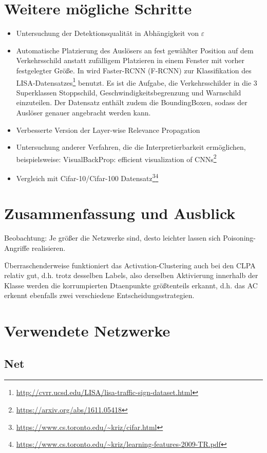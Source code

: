 \documentclass[11pt,a4paper]{article}
\numberwithin{equation}{section}
\begin{document}
	\section{Weitere mögliche Schritte} \label{chapter_weitereSchritte}
	\begin{itemize}
		\item Untersuchung der Detektionsqualität in Abhängigkeit von $\varepsilon$
		\item Automatische Platzierung des Auslösers an fest gewählter Position auf dem Verkehrsschild anstatt zufälligem Platzieren in einem Fenster mit vorher festgelegter Größe. In \cite{badnets} wird  Faster-RCNN (F-RCNN) zur Klassifikation des LISA-Datensatzes\footnote{\url{http://cvrr.ucsd.edu/LISA/lisa-traffic-sign-dataset.html}} benutzt. Es ist die Aufgabe, die Verkehrsschilder in die 3 Superklassen Stoppschild, Geschwindigkeitsbegrenzung und Warnschild einzuteilen. Der Datensatz enthält zudem die BoundingBoxen, sodass der Auslöser genauer angebracht werden kann.
		\item Verbesserte Version der Layer-wise Relevance Propagation
		\item Untersuchung anderer Verfahren, die die Interpretierbarkeit ermöglichen, beispielsweise: VisualBackProp: efficient visualization of CNNs\footnote{\url{https://arxiv.org/abs/1611.05418}}
		\item Vergleich mit Cifar-10/Cifar-100 Datensatz\footnote{\url{https://www.cs.toronto.edu/~kriz/cifar.html}}\footnote{\url{https://www.cs.toronto.edu/~kriz/learning-features-2009-TR.pdf}}
	\end{itemize}
	
	
	\section{Zusammenfassung und Ausblick} \label{chapter_conclusion}
	Beobachtung: Je größer die Netzwerke sind, desto leichter lassen sich Poisoning-Angriffe realisieren.
	
	
	Überraschenderweise funktioniert das Activation-Clustering auch bei den CLPA relativ gut, d.h. trotz desselben Labels, also derselben Aktivierung innerhalb der Klasse werden die korrumpierten Dtaenpunkte größtenteils erkannt, d.h. das AC erkennt ebenfalls zwei verschiedene Entscheidungsstrategien.
	\printglossaries
	\newpage
	\appendix
	\section{Verwendete Netzwerke}
	\subsection{Net}
	
\end{document}
